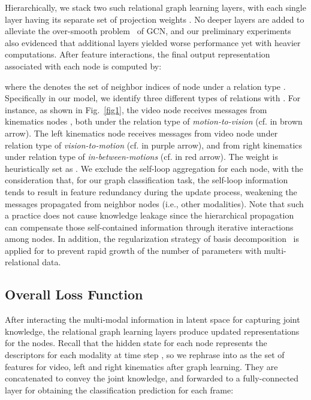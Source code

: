 \documentclass[letterpaper, 10 pt, conference]{ieeeconf}
\begin{document}
Hierarchically, we stack two such relational graph learning layers, with each single layer having its separate set of projection weights . No deeper layers are added to alleviate the over-smooth problem~\cite{li2018deeper} of GCN, and our preliminary experiments also evidenced that additional layers yielded worse performance yet with heavier computations.
After feature interactions, the final output representation associated with each node is computed by:



\begin{scriptsize}

\end{scriptsize}
where the  denotes the set of neighbor indices of node  under a relation type . Specifically in our model, we identify three different types of relations with .
For instance, as shown in Fig.~\ref{fig1}, the video node  receives messages from kinematics nodes , both under the relation type of \emph{motion-to-vision} (cf.  in brown arrow).
The left kinematics node  receives messages from video node  under relation type of \emph{vision-to-motion} (cf.  in purple arrow), and from right kinematics  under relation type of \emph{in-between-motions} (cf.  in red arrow).
The weight  is heuristically set as .
We exclude the self-loop aggregation for each node, with the consideration that, for our graph classification task, the self-loop information tends to result in feature redundancy during the update process, weakening the messages propagated from neighbor nodes (i.e., other modalities). Note that such a practice does not cause knowledge leakage since the hierarchical propagation can compensate those self-contained information through iterative interactions among nodes.
In addition, the regularization strategy of basis decomposition~\cite{schlichtkrull2018modeling} is applied for  to prevent rapid growth of the number of parameters with multi-relational data.

\subsection{Overall Loss Function}

After interacting the multi-modal information in latent space for capturing joint knowledge, the relational graph learning layers produce updated representations for the nodes. Recall that the hidden state for each node represents the descriptors for each modality at time step , so we rephrase  into  as the set of features for video, left and right kinematics after graph learning. They are concatenated to convey the joint knowledge, and forwarded to a fully-connected layer for obtaining the classification prediction  for each frame:
\end{document}
